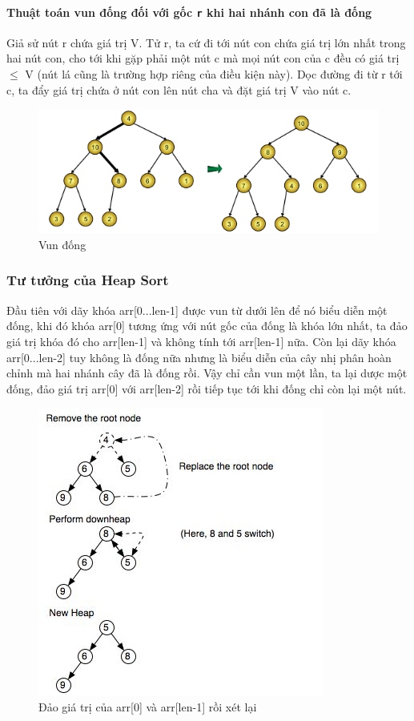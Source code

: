 \documentclass[8pt, a4paper]{article}
\begin{document}
\paragraph{Thuật toán vun đống đối với gốc \texttt{r} khi hai nhánh con đã là đống}
Giả sử nút r chứa giá trị V. Tử r, ta cứ đi tới nút con chứa giá trị lớn nhất trong hai nút con, cho tới khi gặp phải một nút c mà mọi nút con của c đều có giá trị $ \le $ V (nút lá cũng là trường hợp riêng của điều kiện này). Dọc đường đi từ r tới c, ta đẩy giá trị chứa ở nút con lên nút cha và đặt giá trị V vào nút c.
\begin{figure}[htp]
\centering
\includegraphics[scale=0.50]{img/buildheap.png}
\caption{Vun đống}
\label{}
\end{figure}

\subsubsection{Tư tưởng của Heap Sort}

Đầu tiên với dãy khóa arr[0...len-1] được vun từ dưới lên để nó biểu diễn một đống, khi đó khóa arr[0] tương ứng với nút gốc của đống là khóa lớn nhất, ta đảo giá trị khóa đó cho arr[len-1] và không tính tới arr[len-1] nữa. Còn lại dãy khóa arr[0...len-2] tuy không là đống nữa nhưng là biểu diễn của cây nhị phân hoàn chỉnh mà hai nhánh cây đã là đống rồi. Vậy chỉ cần vun một lần, ta lại dược một đống, đảo giá trị arr[0] với arr[len-2] rồi tiếp tục tới khi đống chỉ còn lại một nút.
\begin{figure}[htp]
\centering
\includegraphics[scale=0.5]{img/tachdong.jpg}
\caption{Đảo giá trị của arr[0] và arr[len-1] rồi xét lại}
\label{}
\end{figure}
\end{document}
